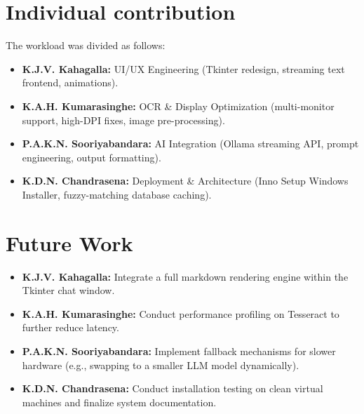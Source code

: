 \documentclass[12pt,a4paper]{report}
\begin{document}
\section{Individual contribution}
The workload was divided as follows:
\begin{itemize}
    \item \textbf{K.J.V. Kahagalla:} UI/UX Engineering (Tkinter redesign, streaming text frontend, animations).
    \item \textbf{K.A.H. Kumarasinghe:} OCR \& Display Optimization (multi-monitor support, high-DPI fixes, image pre-processing).
    \item \textbf{P.A.K.N. Sooriyabandara:} AI Integration (Ollama streaming API, prompt engineering, output formatting).
    \item \textbf{K.D.N. Chandrasena:} Deployment \& Architecture (Inno Setup Windows Installer, fuzzy-matching database caching).
\end{itemize}

\section{Future Work}
\begin{itemize}
    \item \textbf{K.J.V. Kahagalla:} Integrate a full markdown rendering engine within the Tkinter chat window.
    \item \textbf{K.A.H. Kumarasinghe:} Conduct performance profiling on Tesseract to further reduce latency.
    \item \textbf{P.A.K.N. Sooriyabandara:} Implement fallback mechanisms for slower hardware (e.g., swapping to a smaller LLM model dynamically).
    \item \textbf{K.D.N. Chandrasena:} Conduct installation testing on clean virtual machines and finalize system documentation.
\end{itemize}
\end{document}
